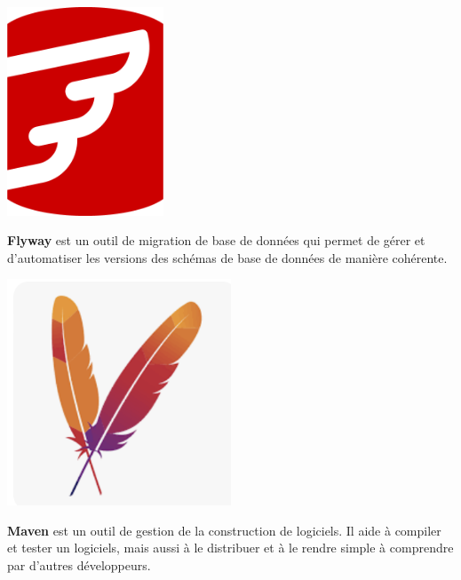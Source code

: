 \begin{center}
    \vspace{2em} %
    
    \begin{minipage}{\textwidth}
        \begin{minipage}{0.2\textwidth}
            \centering
            \includegraphics[width=0.35\textwidth]{images/logo/flyway.png}
        \end{minipage}\hfill
        \begin{minipage}{0.75\textwidth}
            \textbf{Flyway} est un outil de migration de base de données qui permet de gérer et d’automatiser les versions des schémas de base de données de manière cohérente.
        \end{minipage}
    \end{minipage}

    \vspace{2em} %
    
    \begin{minipage}{\textwidth}
        \begin{minipage}{0.2\textwidth}
            \centering
            \includegraphics[width=0.5\textwidth]{images/logo/maven.png}
        \end{minipage}\hfill
        \begin{minipage}{0.75\textwidth}
            \textbf{Maven} est un outil de gestion de la construction de logiciels. Il aide à compiler et tester un logiciels, mais aussi à le distribuer et à le rendre simple à comprendre par d'autres développeurs.
        \end{minipage}
    \end{minipage}
\end{center}

